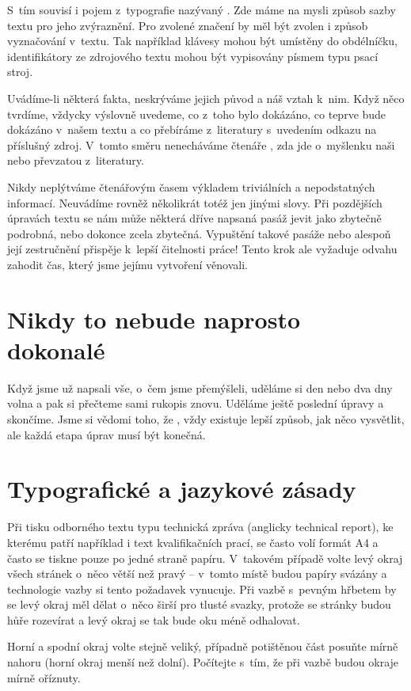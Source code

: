 \documentclass{template/socthesis}
\begin{document}
S~tím souvisí i pojem z~typografie nazývaný . Zde máme na mysli způsob sazby textu pro jeho zvýraznění. Pro zvolené značení by měl být zvolen i způsob vyznačování v~textu. Tak například klávesy mohou být umístěny do obdélníčku, identifikátory ze zdrojového textu mohou být vypisovány písmem typu psací stroj.

Uvádíme-li některá fakta, neskrýváme jejich původ a náš vztah k~nim. Když něco tvrdíme, vždycky výslovně uvedeme, co z~toho bylo dokázáno, co teprve bude dokázáno v~našem textu a co přebíráme z~literatury s~uvedením odkazu na příslušný zdroj. V~tomto směru nenecháváme čtenáře , zda jde o~myšlenku naši nebo převzatou z~literatury.

Nikdy neplýtváme čtenářovým časem výkladem triviálních a nepodstatných informací. Neuvádíme rovněž několikrát totéž jen jinými slovy. Při pozdějších úpravách textu se nám může některá dříve napsaná pasáž jevit jako zbytečně podrobná, nebo dokonce zcela zbytečná. Vypuštění takové pasáže nebo alespoň její zestručnění přispěje k~lepší čitelnosti práce! Tento krok ale vyžaduje odvahu zahodit čas, který jsme jejímu vytvoření věnovali.

\section{Nikdy to nebude naprosto dokonalé}
Když jsme už napsali vše, o~čem jsme přemýšleli, uděláme si den nebo dva dny volna a pak si přečteme sami rukopis znovu. Uděláme ještě poslední úpravy a skončíme. Jsme si vědomi toho, že , vždy existuje lepší způsob, jak něco vysvětlit, ale každá etapa úprav musí být konečná.
 
\section{Typografické a jazykové zásady}
Při tisku odborného textu typu technická zpráva (anglicky technical report), ke kterému patří například i text kvalifikačních prací, se často volí formát A4 a často se tiskne pouze po jedné straně papíru. V~takovém případě volte levý okraj všech stránek o~něco větší než pravý – v~tomto místě budou papíry svázány a technologie vazby si tento požadavek vynucuje. Při vazbě s~pevným hřbetem by se levý okraj měl dělat o~něco širší pro tlusté svazky, protože se stránky budou hůře rozevírat a levý okraj se tak bude oku méně odhalovat.

Horní a spodní okraj volte stejně veliký, případně potištěnou část posuňte mírně nahoru (horní okraj menší než dolní). Počítejte s~tím, že při vazbě budou okraje mírně oříznuty.
\end{document}

